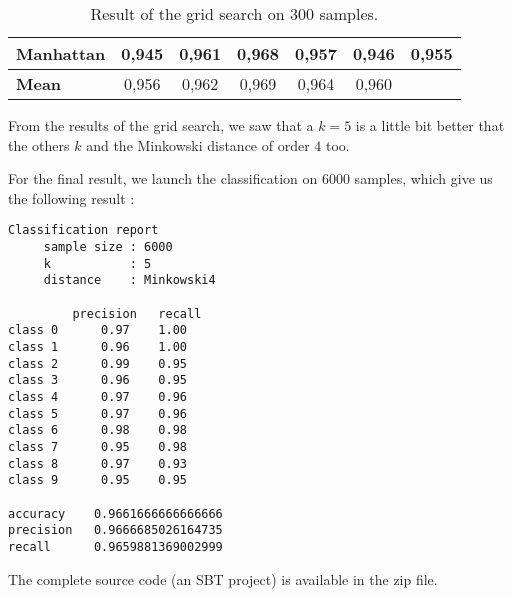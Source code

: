 \documentclass[a4paper,11pt]{report}
\begin{document}
\begin{table}[]
\begin{center}
\begin{tabular}{lcccccc}
      \multicolumn{1}{|l|}{\textbf{Manhattan}}                 & \multicolumn{1}{c|}{0,945}      & \multicolumn{1}{c|}{0,961}      & \multicolumn{1}{c|}{0,968}      & \multicolumn{1}{c|}{0,957}       & \multicolumn{1}{c|}{0,946}       & \multicolumn{1}{c|}{0,955}        \\ \hline
      \multicolumn{1}{|l|}{\textbf{Mean}}                      & \multicolumn{1}{c|}{0,956}      & \multicolumn{1}{c|}{0,962}      & \multicolumn{1}{c|}{0,969}      & \multicolumn{1}{c|}{0,964}       & \multicolumn{1}{c|}{0,960}       &                                   \\ \cline{1-6}
    \end{tabular}
  \end{center}
  \caption{Result of the grid search on $300$ samples.}
  \label{tab:gridsearch}
\end{table}

From the results of the grid search, we saw that a $k=5$ is a little bit better
that the others $k$ and the Minkowski distance of order $4$ too.

For the final result, we launch the classification on $6000$ samples, which give
us the following result :

\begin{verbatim}
Classification report
 	 sample size : 6000
 	 k           : 5
 	 distance    : Minkowski4

		 precision 	 recall
class 0 	 0.97 	 1.00
class 1 	 0.96 	 1.00
class 2 	 0.99 	 0.95
class 3 	 0.96 	 0.95
class 4 	 0.97 	 0.96
class 5 	 0.97 	 0.96
class 6 	 0.98 	 0.98
class 7 	 0.95 	 0.98
class 8 	 0.97 	 0.93
class 9 	 0.95 	 0.95

accuracy   	0.9661666666666666
precision  	0.9666685026164735
recall     	0.9659881369002999
\end{verbatim}

The complete source code (an SBT project) is available in the zip file.
\end{document}
